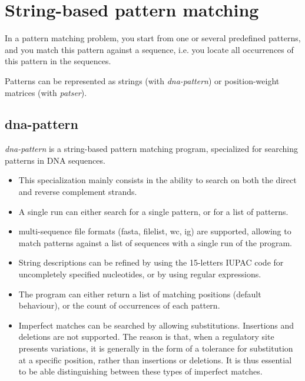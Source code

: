 
\chapter{String-based pattern matching}

In a pattern matching problem, you start from one or several
predefined patterns, and you match this pattern against a sequence,
i.e. you locate all occurrences of this pattern in the sequences.

Patterns can be represented as strings (with \textit{dna-pattern}) or
position-weight matrices (with \textit{patser}). 

\section{dna-pattern}

\textit{dna-pattern} is a string-based pattern matching program,
specialized for searching patterns in DNA sequences. 

\begin{itemize}

\item 
This specialization mainly consists in the ability to search on both
the direct and reverse complement strands.

\item 
A single run can either search for a single pattern, or for a list
of patterns.

\item 
multi-sequence file formats (fasta, filelist, wc, ig) are supported,
allowing to match patterns against a list of sequences with a single
run of the program.

\item 
String descriptions can be refined by using the 15-letters IUPAC code
for uncompletely specified nucleotides, or by using regular
expressions.

\item 
The program can either return a list of matching positions (default
behaviour), or the count of occurrences of each pattern.

\item 
Imperfect matches can be searched by allowing
substitutions. Insertions and deletions are not supported.  The reason
is that, when a regulatory site presents variations, it is generally
in the form of a tolerance for substitution at a specific position,
rather than insertions or deletions. It is thus essential to be able
distinguishing between these types of imperfect matches.

\end{itemize}


